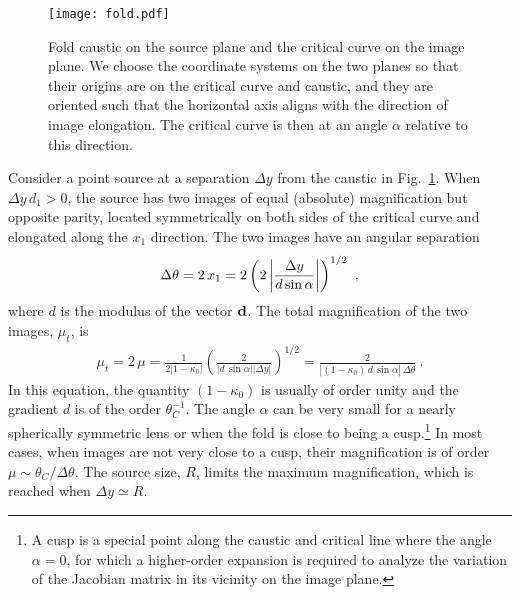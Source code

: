 \documentclass{aastex6}
\newcommand{\reffig}[1]{Fig.~\ref{fig:#1}}
\newcommand{\ba}{\begin{eqnarray}}
\newcommand{\ea}{\end{eqnarray}}
\begin{document}
\begin{figure}[t]
  \begin{center}
    \texttt{[image: fold.pdf]}
    \caption{\label{fig:fold} Fold caustic on the source plane and the critical curve on the image plane. We choose the coordinate systems on the two planes so that their origins are on the critical curve and caustic, and they are oriented such that the horizontal axis aligns with the direction of image elongation. The critical curve is then at an angle $\alpha$ relative to this direction.}
  \end{center}
\end{figure}

 Consider a point source at a separation $\Delta y$ from the
caustic in \reffig{fold}. When $\Delta y\, d_1 > 0$,
the source has two images of equal (absolute) magnification but opposite
parity, located symmetrically on both sides of the critical curve and
elongated along the $x_1$ direction. The two images have an angular separation
\begin{equation}
\label{eq:foldlensmap}
 \Delta \theta = 2\,x_1 = 2 \left({2
  \left|\Delta y \over d \sin{\alpha} \right| } \right)^{1/2} ~,
\end{equation}
where $d$ is the modulus of the vector $\bf d$. The total magnification of
the two images, $\mu_t$, is
\ba
\label{eq:mu1}
\mu_t = 2\, \mu = \frac{1}{2|1-\kappa_0|}
 \left( \frac{2}{\vert d\,\sin\alpha \vert \vert \Delta y \vert } \right)^{1/2}
 = \frac{2}{|(1-\kappa_0)\,d\,\sin\alpha |\, \Delta \theta} ~.
\ea 
In this equation, the quantity $(1-\kappa_0)$ is usually of order unity and the gradient $d$ is of the order $\theta_C^{-1}$. The angle $\alpha$ can be very small for a nearly spherically symmetric lens or when the fold is close to being a cusp.\footnote{A cusp is a special point along the caustic and critical line where the angle $\alpha=0$, for which a higher-order expansion is required to analyze the variation of the Jacobian matrix in its vicinity on the image plane.} In most cases, 
when images are not very close to a cusp, their magnification is of order $\mu\sim \theta_C/\Delta \theta$. 
The source size, $R$, limits the maximum magnification, which is reached when 
$\Delta y\simeq R$.
\end{document}
